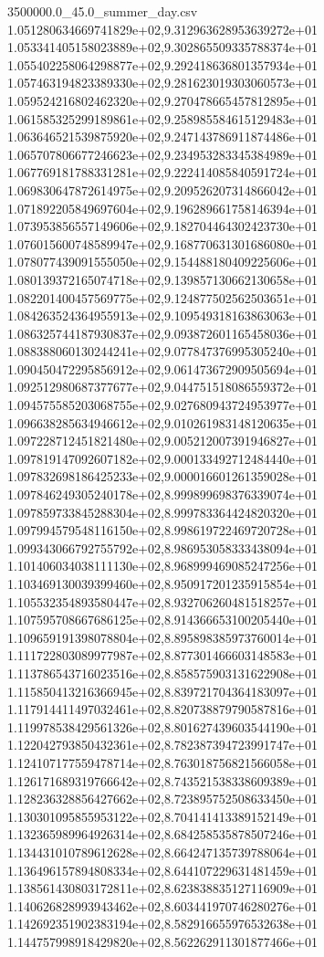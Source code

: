 \begin{filecontents*}{3500000.0_45.0_summer_day.csv}
1.051280634669741829e+02,9.312963628953639272e+01
1.053341405158023889e+02,9.302865509335788374e+01
1.055402258064298877e+02,9.292418636801357934e+01
1.057463194823389330e+02,9.281623019303060573e+01
1.059524216802462320e+02,9.270478665457812895e+01
1.061585325299189861e+02,9.258985584615129483e+01
1.063646521539875920e+02,9.247143786911874486e+01
1.065707806677246623e+02,9.234953283345384989e+01
1.067769181788331281e+02,9.222414085840591724e+01
1.069830647872614975e+02,9.209526207314866042e+01
1.071892205849697604e+02,9.196289661758146394e+01
1.073953856557149606e+02,9.182704464302423730e+01
1.076015600748589947e+02,9.168770631301686080e+01
1.078077439091555050e+02,9.154488180409225606e+01
1.080139372165074718e+02,9.139857130662130658e+01
1.082201400457569775e+02,9.124877502562503651e+01
1.084263524364955913e+02,9.109549318163863063e+01
1.086325744187930837e+02,9.093872601165458036e+01
1.088388060130244241e+02,9.077847376995305240e+01
1.090450472295856912e+02,9.061473672909505694e+01
1.092512980687377677e+02,9.044751518086559372e+01
1.094575585203068755e+02,9.027680943724953977e+01
1.096638285634946612e+02,9.010261983148120635e+01
1.097228712451821480e+02,9.005212007391946827e+01
1.097819147092607182e+02,9.000133492712484440e+01
1.097832698186425233e+02,9.000016601261359028e+01
1.097846249305240178e+02,8.999899698376339074e+01
1.097859733845288304e+02,8.999783364424820320e+01
1.097994579548116150e+02,8.998619722469720728e+01
1.099343066792755792e+02,8.986953058333438094e+01
1.101406034038111130e+02,8.968999469085247256e+01
1.103469130039399460e+02,8.950917201235915854e+01
1.105532354893580447e+02,8.932706260481518257e+01
1.107595708667686125e+02,8.914366653100205440e+01
1.109659191398078804e+02,8.895898385973760014e+01
1.111722803089977987e+02,8.877301466603148583e+01
1.113786543716023516e+02,8.858575903131622908e+01
1.115850413216366945e+02,8.839721704364183097e+01
1.117914411497032461e+02,8.820738879790587816e+01
1.119978538429561326e+02,8.801627439603544190e+01
1.122042793850432361e+02,8.782387394723991747e+01
1.124107177559478714e+02,8.763018756821566058e+01
1.126171689319766642e+02,8.743521538338609389e+01
1.128236328856427662e+02,8.723895752508633450e+01
1.130301095855953122e+02,8.704141413389152149e+01
1.132365989964926314e+02,8.684258535878507246e+01
1.134431010789612628e+02,8.664247135739788064e+01
1.136496157894808334e+02,8.644107229631481459e+01
1.138561430803172811e+02,8.623838835127116909e+01
1.140626828993943462e+02,8.603441970746280276e+01
1.142692351902383194e+02,8.582916655976532638e+01
1.144757998918429820e+02,8.562262911301877466e+01

\end{filecontents*}
